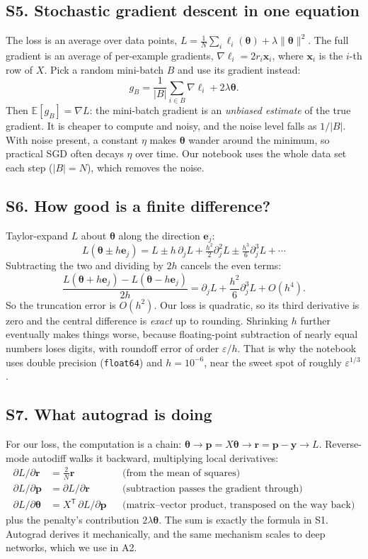 \documentclass[11pt]{article}
\newcommand{\T}{\mathsf{T}}
\newcommand{\vth}{\bm{\theta}}
\newcommand{\grad}{\nabla}
\begin{document}
\subsection*{S5. Stochastic gradient descent in one equation}
The loss is an average over data points, $L=\frac1N\sum_i\ell_i(\vth)+\lambda\lVert\vth\rVert^2$. The full gradient is an average of per-example gradients, $\grad\ell_i=2r_i\mathbf x_i$, where $\mathbf x_i$ is the $i$-th row of $X$. Pick a random mini-batch $B$ and use its gradient instead:
\[
  g_B=\frac1{|B|}\sum_{i\in B}\grad\ell_i+2\lambda\vth .
\]
Then $\mathbb E[g_B]=\grad L$: the mini-batch gradient is an \emph{unbiased estimate} of the true gradient. It is cheaper to compute and noisy, and the noise level falls as $1/|B|$. With noise present, a constant $\eta$ makes $\vth$ wander around the minimum, so practical SGD often decays $\eta$ over time. Our notebook uses the whole data set each step ($|B|=N$), which removes the noise.

\subsection*{S6. How good is a finite difference?}
Taylor-expand $L$ about $\vth$ along the direction $\mathbf e_j$:
\[
  L(\vth\pm h\mathbf e_j)=L\pm h\,\partial_jL+\tfrac{h^2}{2}\partial_j^2L\pm\tfrac{h^3}{6}\partial_j^3L+\cdots
\]
Subtracting the two and dividing by $2h$ cancels the even terms:
\[
  \frac{L(\vth+h\mathbf e_j)-L(\vth-h\mathbf e_j)}{2h}
  =\partial_jL+\frac{h^2}{6}\partial_j^3L+O(h^4).
\]
So the truncation error is $O(h^2)$. Our loss is quadratic, so its third derivative is zero and the central difference is \emph{exact} up to rounding. Shrinking $h$ further eventually makes things worse, because floating-point subtraction of nearly equal numbers loses digits, with roundoff error of order $\varepsilon/h$. That is why the notebook uses double precision (\texttt{float64}) and $h=10^{-6}$, near the sweet spot of roughly $\varepsilon^{1/3}$.

\subsection*{S7. What autograd is doing}
For our loss, the computation is a chain: $\vth\to\mathbf p=X\vth\to\mathbf r=\mathbf p-\mathbf y\to L$. Reverse-mode autodiff walks it backward, multiplying local derivatives:
\begin{align*}
  \partial L/\partial\mathbf r &= \tfrac2N\mathbf r &&\text{(from the mean of squares)}\\
  \partial L/\partial\mathbf p &= \partial L/\partial\mathbf r &&\text{(subtraction passes the gradient through)}\\
  \partial L/\partial\vth &= X^{\T}\,\partial L/\partial\mathbf p &&\text{(matrix--vector product, transposed on the way back)}
\end{align*}
plus the penalty's contribution $2\lambda\vth$. The sum is exactly the formula in S1. Autograd derives it mechanically, and the same mechanism scales to deep networks, which we use in A2.
\end{document}
